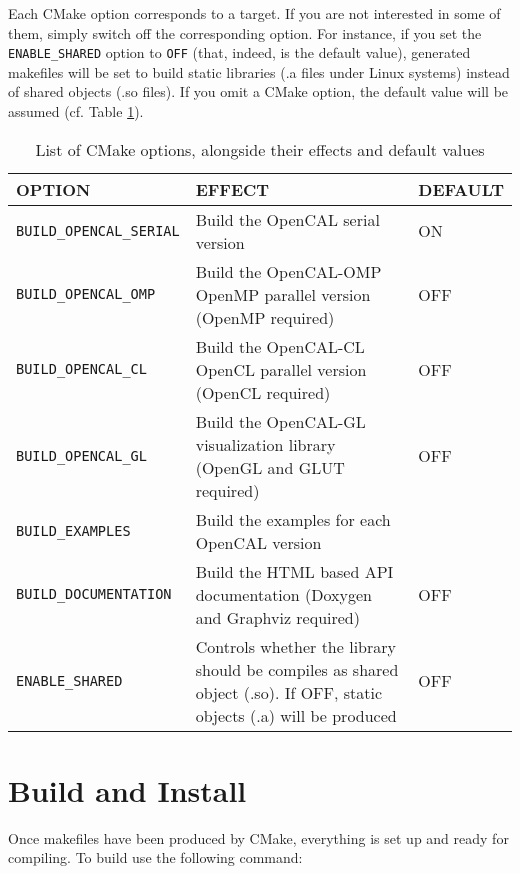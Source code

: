 Each CMake option corresponds to a target. If you are not interested
in some of them, simply switch off the corresponding option. For
instance, if you set the \verb'ENABLE_SHARED' option to \verb'OFF'
(that, indeed, is the default value), generated makefiles will be set
to build static libraries (.a files under Linux systems) instead of
shared objects (.so files). If you omit a CMake option, the default
value will be assumed (cf. Table \ref{ch:installation:cmakeoptions}).


\begin{table}[]
  \centering
  \caption{List of CMake options, alongside their effects and default
    values}
  \label{ch:installation:cmakeoptions}
  \begin{tabularx}{\textwidth}{lXl}
    \hline
    \textbf{OPTION} & \textbf{EFFECT} & \textbf{DEFAULT}\\
    \hline\hline
    \texttt{BUILD\_OPENCAL\_SERIAL} & Build the OpenCAL serial version  & ON   \\ \hline
    \texttt{BUILD\_OPENCAL\_OMP} &  Build the OpenCAL-OMP OpenMP parallel version (OpenMP required)    & OFF \\ \hline
    \texttt{BUILD\_OPENCAL\_CL} &  Build the OpenCAL-CL OpenCL parallel version (OpenCL required)     &OFF\\ \hline
    \texttt{BUILD\_OPENCAL\_GL} & Build the OpenCAL-GL visualization library (OpenGL and GLUT required)      &OFF \\ \hline
    \texttt{BUILD\_EXAMPLES} & Build the examples for each OpenCAL version      &\\ \hline
    \texttt{BUILD\_DOCUMENTATION}  &  Build the HTML based API documentation (Doxygen and Graphviz required)  & OFF   \\ \hline
    \texttt{ENABLE\_SHARED} &  Controls whether the library should be compiles as shared object (.so). If OFF, static objects (.a) will be produced & OFF\\ \hline
  \end{tabularx}
\end{table}


\section{Build and Install}
Once makefiles have been produced by CMake, everything is set up and
ready for compiling. To build use the following command:

